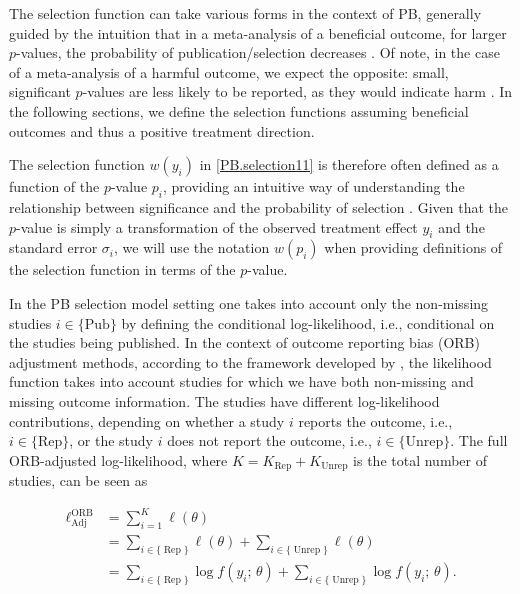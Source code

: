 \documentclass[twocolumn]{article}\usepackage[]{graphicx}\usepackage[]{xcolor}
\begin{document}
The selection function can take various forms in the context of PB, generally guided by the intuition that in a meta-analysis of a beneficial outcome, for larger $p$-values, the probability of publication/selection decreases \citep{selection0, HedgesVev, selection1, selection2, selectionWeird, selectionCont, reviewselection}. Of note, in the case of a meta-analysis of a harmful outcome, we expect the opposite: small, significant $p$-values are less likely to be reported, as they would indicate harm \citep{ORBIT_paper, Copas2019}. In the following sections, we define the selection functions assuming beneficial outcomes and thus a positive treatment direction.

The selection function $w(y_i)$ in \eqref{PB.selection11} is therefore often defined as a function of the $p$-value $p_i$, providing an intuitive way of understanding the relationship between significance and the probability of selection \citep{selection1, selection2, reviewselection}. Given that the $p$-value is simply a transformation of the observed treatment effect $y_i$ and the standard error $\sigma_i$, we will use the notation $w(p_i)$ when providing definitions of the selection function in terms of the $p$-value.


In the PB selection model setting one takes into account only the non-missing studies $i \in \{\text{Pub} \}$ by defining the conditional log-likelihood, i.e., conditional on the studies being published. In the context of outcome reporting bias (ORB) adjustment methods, according to the framework developed by \citet{Copas2019}, the likelihood function takes into account studies for which we have both non-missing and missing outcome information. The studies have different log-likelihood contributions, depending on whether a study $i$ reports the outcome, i.e., $i \in \{\text{Rep} \}$, or the study $i$ does not report the outcome, i.e., $i \in \{ \text{Unrep} \}$. The full ORB-adjusted log-likelihood, where $K = K_{\text {Rep}}+ K_{\text {Unrep}}$ is the total number of studies, can be seen as


\begin{equation}
\label{lik.full}
\begin{aligned}
\ell_{\text{Adj}}^{\text{ORB}} & =\sum_{i=1}^K \ell \left(\theta \right)\\
& =\sum_{i \in \{ \operatorname{Rep}\} } \ell\left(\theta \right)+\sum_{i \in \{\operatorname{Unrep} \} } \ell\left(\theta \right) \\
& =\sum_{i \in \{\operatorname{Rep} \} } \log f \left(y_i \text{; } \theta \right)+\sum_{i \in \{\operatorname{Unrep} \} } \log f \left(y_i \text{; } \theta \right) \text{.}
\end{aligned}
\end{equation}
\end{document}
